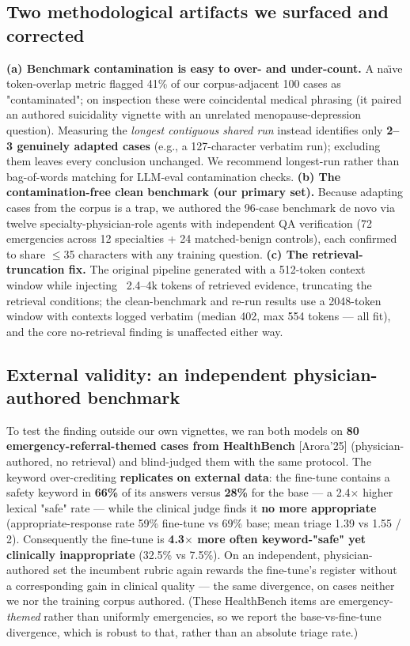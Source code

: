 \documentclass[11pt]{article}
\begin{document}
\subsection{Two methodological artifacts we surfaced and corrected}

\textbf{(a) Benchmark contamination is easy to over- and under-count.} A na\"{\i}ve token-overlap metric flagged 41\% of our corpus-adjacent 100 cases as "contaminated"; on inspection these were coincidental medical phrasing (it paired an authored suicidality vignette with an unrelated menopause-depression question). Measuring the \textit{longest contiguous shared run} instead identifies only \textbf{2--3 genuinely adapted cases} (e.g., a 127-character verbatim run); excluding them leaves every conclusion unchanged. We recommend longest-run rather than bag-of-words matching for LLM-eval contamination checks. \textbf{(b) The contamination-free clean benchmark (our primary set).} Because adapting cases from the corpus is a trap, we authored the 96-case benchmark de novo via twelve specialty-physician-role agents with independent QA verification (72 emergencies across 12 specialties + 24 matched-benign controls), each confirmed to share \(\leq\)35 characters with any training question. \textbf{(c) The retrieval-truncation fix.} The original pipeline generated with a 512-token context window while injecting ~2.4--4k tokens of retrieved evidence, truncating the retrieval conditions; the clean-benchmark and re-run results use a 2048-token window with contexts logged verbatim (median 402, max 554 tokens --- all fit), and the core no-retrieval finding is unaffected either way.


\subsection{External validity: an independent physician-authored benchmark}

To test the finding outside our own vignettes, we ran both models on \textbf{80 emergency-referral-themed cases from HealthBench} [Arora'25] (physician-authored, no retrieval) and blind-judged them with the same protocol. The keyword over-crediting \textbf{replicates on external data}: the fine-tune contains a safety keyword in \textbf{66\%} of its answers versus \textbf{28\%} for the base --- a 2.4\(\times\) higher lexical "safe" rate --- while the clinical judge finds it \textbf{no more appropriate} (appropriate-response rate 59\% fine-tune vs 69\% base; mean triage 1.39 vs 1.55 / 2). Consequently the fine-tune is \textbf{4.3\(\times\) more often keyword-"safe" yet clinically inappropriate} (32.5\% vs 7.5\%). On an independent, physician-authored set the incumbent rubric again rewards the fine-tune's register without a corresponding gain in clinical quality --- the same divergence, on cases neither we nor the training corpus authored. (These HealthBench items are emergency-\textit{themed} rather than uniformly emergencies, so we report the base-vs-fine-tune divergence, which is robust to that, rather than an absolute triage rate.)
\end{document}
